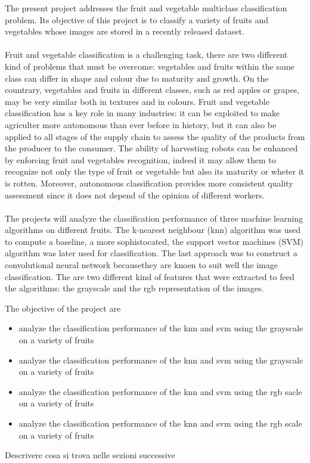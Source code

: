 \documentclass{article}
\begin{document}
The present project addresses the fruit and vegetable multiclass classification problem. Its objective of this project is to classify a variety of fruits and vegetables whose images are stored in a recently released dataset.\\
\\
Fruit and vegetable classification is a challenging task, there are two different kind of problems that must be overcome: vegetables and fruits within the same class can differ in shape and colour due to maturity and growth. On the countrary, vegetables and fruits in different classes, such as red apples or grapes, may be very similar both in textures and in colours. 
Fruit and vegetable classification has a key role in many industries: it can be exploited to make agriculter more autonomous than ever before in history, but it can also be applied to all stages of the supply chain to assess the quality of the products from the producer to the consumer. 
The ability of harvesting robots can be enhanced by enforcing fruit and vegetables recognition, indeed it may allow them to recognize not only the type of fruit or vegetable but also its maturity or wheter it is rotten. Moreover, autonomous classification provides more consistent quality assessment since it does not depend of the opinion of different workers.
\\\\
The projects will analyze the classification performance of three machine learning algorithms on different fruits. The k-nearest neighbour (knn) algorithm was used to compute a baseline, a more sophistocated, the support vector machines (SVM) algorithm was later used for classification. The last approach was to construct a convolutional neural network becausethey are knoen to suit well the image classification. The are two different kind of features that were extracted to feed the algorithms: the grayscale and the rgb representation of the images.

The objective of the project are
\begin{itemize}
\item analyze the classification performance of the knn and svm using the grayscale on a variety of fruits
\item analyze the classification performance of the knn and svm using the grayscale on a variety of fruits
\item analyze the classification performance of the knn and svm using the rgb sacle on a variety of fruits
\item analyze the classification performance of the knn and svm using the rgb scale on a variety of fruits
\end{itemize}
Descrivere cosa si trova nelle sezioni successive
\end{document}
